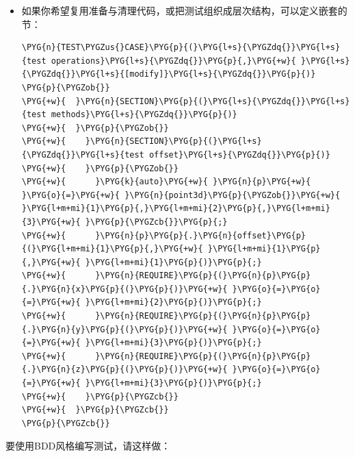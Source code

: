 \begin{itemize}

\item 如果你希望复用准备与清理代码，或把测试组织成层次结构，可以定义嵌套的节：



\begin{codeblockbg}
\begin{Verbatim}[commandchars=\\\{\},breaklines=true,breakanywhere=true,fontsize=\codefont,xleftmargin=17bp]
\PYG{n}{TEST\PYGZus{}CASE}\PYG{p}{(}\PYG{l+s}{\PYGZdq{}}\PYG{l+s}{test operations}\PYG{l+s}{\PYGZdq{}}\PYG{p}{,}\PYG{+w}{ }\PYG{l+s}{\PYGZdq{}}\PYG{l+s}{[modify]}\PYG{l+s}{\PYGZdq{}}\PYG{p}{)}
\PYG{p}{\PYGZob{}}
\PYG{+w}{  }\PYG{n}{SECTION}\PYG{p}{(}\PYG{l+s}{\PYGZdq{}}\PYG{l+s}{test methods}\PYG{l+s}{\PYGZdq{}}\PYG{p}{)}
\PYG{+w}{  }\PYG{p}{\PYGZob{}}
\PYG{+w}{    }\PYG{n}{SECTION}\PYG{p}{(}\PYG{l+s}{\PYGZdq{}}\PYG{l+s}{test offset}\PYG{l+s}{\PYGZdq{}}\PYG{p}{)}
\PYG{+w}{    }\PYG{p}{\PYGZob{}}
\PYG{+w}{      }\PYG{k}{auto}\PYG{+w}{ }\PYG{n}{p}\PYG{+w}{ }\PYG{o}{=}\PYG{+w}{ }\PYG{n}{point3d}\PYG{p}{\PYGZob{}}\PYG{+w}{ }\PYG{l+m+mi}{1}\PYG{p}{,}\PYG{l+m+mi}{2}\PYG{p}{,}\PYG{l+m+mi}{3}\PYG{+w}{ }\PYG{p}{\PYGZcb{}}\PYG{p}{;}
\PYG{+w}{      }\PYG{n}{p}\PYG{p}{.}\PYG{n}{offset}\PYG{p}{(}\PYG{l+m+mi}{1}\PYG{p}{,}\PYG{+w}{ }\PYG{l+m+mi}{1}\PYG{p}{,}\PYG{+w}{ }\PYG{l+m+mi}{1}\PYG{p}{)}\PYG{p}{;}
\PYG{+w}{      }\PYG{n}{REQUIRE}\PYG{p}{(}\PYG{n}{p}\PYG{p}{.}\PYG{n}{x}\PYG{p}{(}\PYG{p}{)}\PYG{+w}{ }\PYG{o}{=}\PYG{o}{=}\PYG{+w}{ }\PYG{l+m+mi}{2}\PYG{p}{)}\PYG{p}{;}
\PYG{+w}{      }\PYG{n}{REQUIRE}\PYG{p}{(}\PYG{n}{p}\PYG{p}{.}\PYG{n}{y}\PYG{p}{(}\PYG{p}{)}\PYG{+w}{ }\PYG{o}{=}\PYG{o}{=}\PYG{+w}{ }\PYG{l+m+mi}{3}\PYG{p}{)}\PYG{p}{;}
\PYG{+w}{      }\PYG{n}{REQUIRE}\PYG{p}{(}\PYG{n}{p}\PYG{p}{.}\PYG{n}{z}\PYG{p}{(}\PYG{p}{)}\PYG{+w}{ }\PYG{o}{=}\PYG{o}{=}\PYG{+w}{ }\PYG{l+m+mi}{3}\PYG{p}{)}\PYG{p}{;}
\PYG{+w}{    }\PYG{p}{\PYGZcb{}}
\PYG{+w}{  }\PYG{p}{\PYGZcb{}}
\PYG{p}{\PYGZcb{}}
\end{Verbatim}
\end{codeblockbg}

\end{itemize}



要使用BDD风格编写测试，请这样做：



